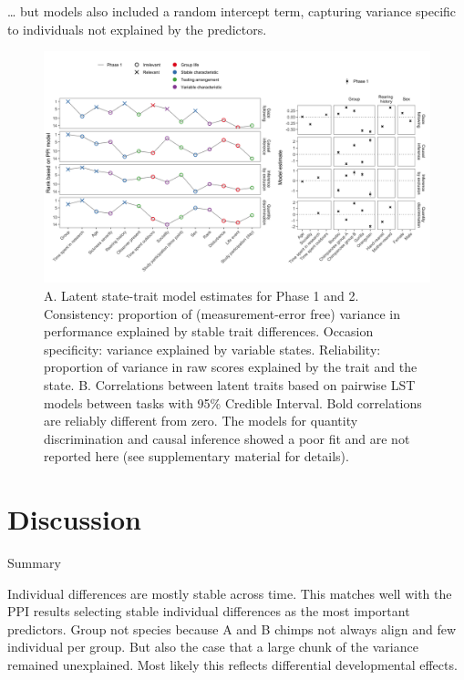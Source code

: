\documentclass[
  man,floatsintext]{apa6}
\begin{document}
\ldots{} but models also included a random intercept term, capturing variance specific to individuals not explained by the predictors.

\begin{figure}

{\centering \includegraphics[width=1\linewidth]{./figures/ppi3} 

}

\caption{A. Latent state-trait model estimates for Phase 1 and 2. Consistency: proportion of (measurement-error free) variance in performance explained by stable trait differences. Occasion specificity: variance explained by variable states. Reliability: proportion of variance in raw scores explained by the trait and the state. B. Correlations between latent traits based on pairwise LST models between tasks with 95\% Credible Interval. Bold correlations are reliably different from zero. The models for quantity discrimination and causal inference showed a poor fit and are not reported here (see supplementary material for details).}\label{fig:ppiplot}
\end{figure}

\hypertarget{discussion}{%
\section{Discussion}\label{discussion}}

Summary

Individual differences are mostly stable across time. This matches well with the PPI results selecting stable individual differences as the most important predictors. Group not species because A and B chimps not always align and few individual per group. But also the case that a large chunk of the variance remained unexplained. Most likely this reflects differential developmental effects.
\end{document}
